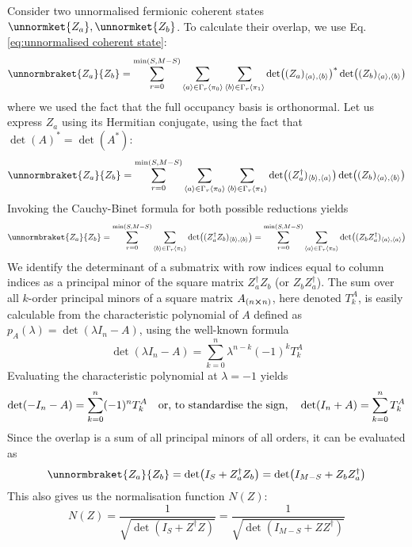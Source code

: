 \documentclass[12pt]{article}
\newcommand{\seq}[1]{\langle #1\rangle}
\newcommand{\hc}{^\dagger}
\begin{document}
	Consider two unnormalised fermionic coherent states $\unnormket{Z_a}, \unnormket{Z_b}$. To calculate their overlap, we use Eq. \ref{eq:unnormalised coherent state}:
	\begin{equation}
	\unnormbraket{Z_a}{Z_b}=\sum_{r=0}^{\min(S,M-S)}\sum_{\seq{a}\in\Gamma_r\seq{\pi_0}}\sum_{\seq{b}\in\Gamma_r\seq{\pi_1}}\det((Z_a)_{\seq{a},\seq{b}})^*\det((Z_b)_{\seq{a},\seq{b}})
	\end{equation}
	where we used the fact that the full occupancy basis is orthonormal. Let us express $Z_a$ using its Hermitian conjugate, using the fact that $\det(A)^*=\det(A^*)$:
	\begin{equation}\label{eq: overlap intermediate step}
	\unnormbraket{Z_a}{Z_b}=\sum_{r=0}^{\min(S,M-S)}\sum_{\seq{a}\in\Gamma_r\seq{\pi_0}}\sum_{\seq{b}\in\Gamma_r\seq{\pi_1}}\det((Z_a\hc)_{\seq{b}, \seq{a}})\det((Z_b)_{\seq{a},\seq{b}})
	\end{equation}
	Invoking the Cauchy-Binet formula for both possible reductions yields
	\begin{equation}
	\unnormbraket{Z_a}{Z_b}=\sum_{r=0}^{\min(S,M-S)}\sum_{\seq{b}\in\Gamma_r\seq{\pi_1}}\det((Z_a\hc Z_b)_{\seq{b}, \seq{b}})=\sum_{r=0}^{\min(S,M-S)}\sum_{\seq{a}\in\Gamma_r\seq{\pi_0}}\det((Z_b Z_a\hc)_{\seq{a}, \seq{a}})
	\end{equation}
	We identify the determinant of a submatrix with row indices equal to column indices as a principal minor of the square matrix $Z_a\hc Z_b$ (or $Z_b Z_a\hc$). The sum over all $k$-order principal minors of a square matrix $A_{(n\cross n)}$, here denoted $T^A_k$, is easily calculable from the characteristic polynomial of $A$ defined as $p_A(\lambda)=\det(\lambda I_n-A)$, using the well-known formula
	\begin{equation}
	\det(\lambda I_n-A)=\sum_{k=0}^n \lambda^{n-k}(-1)^k T^A_k
	\end{equation}
	Evaluating the characteristic polynomial at $\lambda = -1$ yields
	\begin{equation}
	\det(-I_n-A)=\sum_{k=0}^n (-1)^n T^A_k\qq{or, to standardise the sign,} \det(I_n+A)=\sum_{k=0}^n T^A_k
	\end{equation}
	Since the overlap is a sum of all principal minors of all orders, it can be evaluated as
	\begin{equation}
	\unnormbraket{Z_a}{Z_b}=\det(I_{S}+Z_a\hc Z_b)=\det(I_{M-S}+Z_b Z_a\hc)
	\end{equation}
	This also gives us the normalisation function $N(Z)$:
	\begin{equation}
	N(Z)=\frac{1}{\sqrt{\det(I_{S}+Z\hc Z)}}=\frac{1}{\sqrt{\det(I_{M-S}+ZZ\hc)}}
	\end{equation}
	
\end{document}
